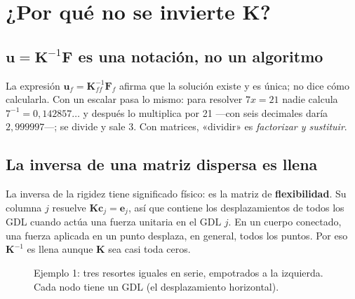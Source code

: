 \documentclass[11pt,a4paper]{article}
\newcommand{\mK}{\bm{K}}
\newcommand{\Kff}{\bm{K}_{ff}}
\begin{document}
\section{¿Por qué no se invierte \texorpdfstring{$\bm{K}$}{K}?}\label{sec:inversa}

\subsection{\texorpdfstring{$\bm{u}=\bm{K}^{-1}\bm{F}$}{u = inv(K) F} es una notación, no un algoritmo}

La expresión $\bm{u}_f=\Kff^{-1}\bm{F}_f$ afirma que la solución existe y es única; no dice cómo calcularla. Con un escalar pasa lo mismo: para resolver $7x=21$ nadie calcula $7^{-1}=0{,}142857\ldots$ y después lo multiplica por 21 ---con seis decimales daría $2{,}999997$---; se divide y sale $3$. Con matrices, «dividir» es \emph{factorizar y sustituir}.

\subsection{La inversa de una matriz dispersa es llena}\label{sec:inversa-llena}

La inversa de la rigidez tiene significado físico: es la matriz de \textbf{flexibilidad}. Su columna $j$ resuelve $\mK\bm{c}_j=\bm{e}_j$, así que contiene los desplazamientos de todos los GDL cuando actúa una fuerza unitaria en el GDL $j$. En un cuerpo conectado, una fuerza aplicada en un punto desplaza, en general, todos los puntos. Por eso $\mK^{-1}$ es llena aunque $\mK$ sea casi toda ceros.

\begin{figure}[htbp]
\centering
{}
\caption{Ejemplo 1: tres resortes iguales en serie, empotrados a la izquierda. Cada nodo tiene un GDL (el desplazamiento horizontal).}
\label{fig:cadena}
\end{figure}
\end{document}
